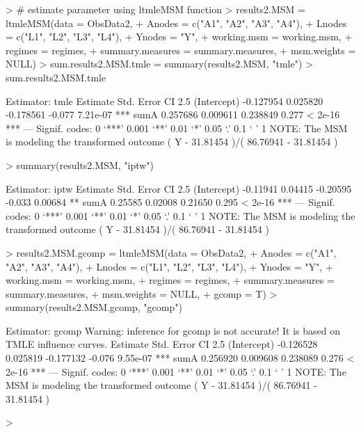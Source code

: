 \documentclass{exam}
\begin{document}
\begin{Schunk}
\begin{Sinput}
> # estimate parameter using ltmleMSM function
> results2.MSM = ltmleMSM(data = ObsData2, 
+                         Anodes = c("A1", "A2", "A3", "A4"), 
+                         Lnodes = c("L1", "L2", "L3", "L4"), 
+                         Ynodes = "Y", 
+                         working.msm = working.msm, 
+                         regimes = regimes, 
+                         summary.measures = summary.measures, 
+                         msm.weights = NULL)
> sum.results2.MSM.tmle = summary(results2.MSM, "tmle")
> sum.results2.MSM.tmle
\end{Sinput}
\begin{Soutput}
Estimator:  tmle 
             Estimate Std. Error   CI 2.5%
(Intercept) -0.127954   0.025820 -0.178561   -0.077 7.21e-07 ***
sumA         0.257686   0.009611  0.238849    0.277  < 2e-16 ***
---
Signif. codes:  0 ‘***’ 0.001 ‘**’ 0.01 ‘*’ 0.05 ‘.’ 0.1 ‘ ’ 1
NOTE: The MSM is modeling the transformed outcome ( Y - 31.81454 )/( 86.76941 - 31.81454 )
\end{Soutput}
\begin{Sinput}
> summary(results2.MSM, "iptw")
\end{Sinput}
\begin{Soutput}
Estimator:  iptw 
            Estimate Std. Error  CI 2.5%
(Intercept) -0.11941    0.04415 -0.20595   -0.033 0.00684 ** 
sumA         0.25585    0.02008  0.21650    0.295 < 2e-16 ***
---
Signif. codes:  0 ‘***’ 0.001 ‘**’ 0.01 ‘*’ 0.05 ‘.’ 0.1 ‘ ’ 1
NOTE: The MSM is modeling the transformed outcome ( Y - 31.81454 )/( 86.76941 - 31.81454 )
\end{Soutput}
\begin{Sinput}
> results2.MSM.gcomp = ltmleMSM(data = ObsData2, 
+                               Anodes = c("A1", "A2", "A3", "A4"), 
+                               Lnodes = c("L1", "L2", "L3", "L4"), 
+                               Ynodes = "Y", 
+                               working.msm = working.msm, 
+                               regimes = regimes, 
+                               summary.measures = summary.measures, 
+                               msm.weights = NULL,
+                               gcomp = T)
> summary(results2.MSM.gcomp, "gcomp")
\end{Sinput}
\begin{Soutput}
Estimator:  gcomp 
Warning: inference for gcomp is not accurate! It is based on TMLE influence curves.
             Estimate Std. Error   CI 2.5%
(Intercept) -0.126528   0.025819 -0.177132   -0.076 9.55e-07 ***
sumA         0.256920   0.009608  0.238089    0.276  < 2e-16 ***
---
Signif. codes:  0 ‘***’ 0.001 ‘**’ 0.01 ‘*’ 0.05 ‘.’ 0.1 ‘ ’ 1
NOTE: The MSM is modeling the transformed outcome ( Y - 31.81454 )/( 86.76941 - 31.81454 )
\end{Soutput}
\begin{Sinput}
> 
\end{Sinput}
\end{Schunk}
\end{document}
